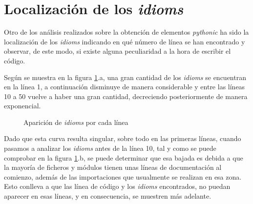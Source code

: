 \documentclass[a4paper, 12pt]{book}
\begin{document}

\section{Localización de los \textit{idioms}}

Otro de los análisis realizados sobre la obtención de elementos \textit{pythonic} ha sido la localización de los \textit{idioms} indicando en qué número de línea se han encontrado y observar, de este modo, si existe alguna peculiaridad a la hora de escribir el código.

Según se muestra en la figura \ref{fig:lines_idioms}.a, una gran cantidad de los \textit{idioms} se encuentran en la línea 1, a continuación disminuye de manera considerable y entre las líneas 10 a 50 vuelve a haber una gran cantidad, decreciendo posteriormente de manera exponencial. 

\begin{figure}[b]
\centering
{}
\caption{Aparición de \textit{idioms} por cada línea}
\label{fig:lines_idioms}
\end{figure}

Dado que esta curva resulta singular, sobre todo en las primeras líneas, cuando pasamos a analizar los \textit{idioms} antes de la línea 10, tal y como se puede comprobar en la figura \ref{fig:lines_idioms}.b, se puede determinar que esa bajada es debida a que la mayoría de ficheros y módulos tienen unas líneas de documentación al comienzo, además de las importaciones que usualmente se realizan en esa zona. Esto conlleva a que las línea de código y los \textit{idioms} encontrados, no puedan aparecer en esas líneas, y en consecuencia, se muestren más adelante.
\end{document}
